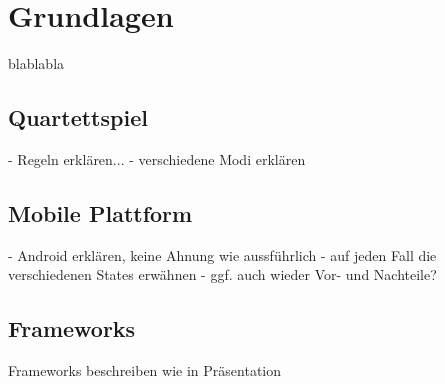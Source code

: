 \chapter{Grundlagen}
\label{cha:grundlagen}

blablabla

\section{Quartettspiel}
\label{sec:grundlagen:quartettspiel}

- Regeln erklären...
- verschiedene Modi erklären

\section{Mobile Plattform}
\label{sec:grundlagen:plattforml}

- Android erklären, keine Ahnung wie aussführlich
- auf jeden Fall die verschiedenen States erwähnen
- ggf. auch wieder Vor- und Nachteile?

\section{Frameworks}
\label{sec:grundlagen:frameworks}
Frameworks beschreiben wie in Präsentation


